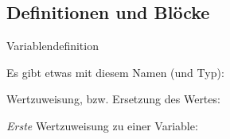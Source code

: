 {\subsection{Definitionen und Blöcke}
\begin{frame}[c]{Variablendefinition}
   \begin{description}[Initialisierung]
      \itemsep=12pt
      \item<2->[Deklaration] Es gibt etwas mit diesem Namen (und Typ):\\
      \item<4->[Zuweisung] Wertzuweisung, bzw. Ersetzung des Wertes:\\
      \item<6->[Initialisierung] \textit{Erste} Wertzuweisung zu einer Variable:\\
   \end{description}\medskip
   \begin{center}
   \end{center}
\end{frame}

}
